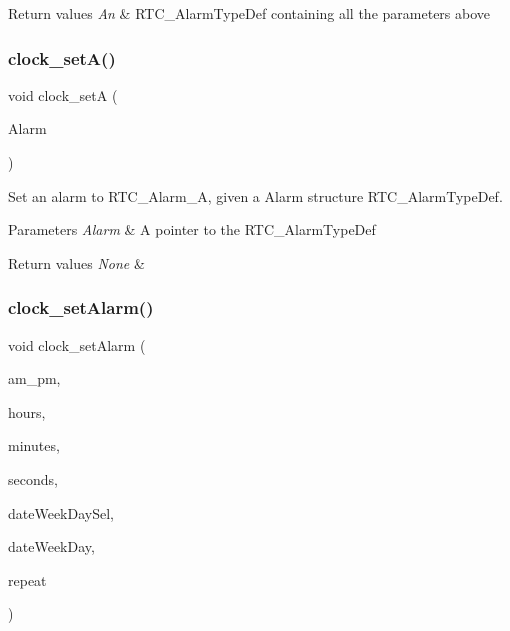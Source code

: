 \begin{DoxyRetVals}{Return values}
{\em An} & R\+T\+C\+\_\+\+Alarm\+Type\+Def containing all the parameters above \\
\hline
\end{DoxyRetVals}
\mbox{\label{group___clock___alarms_gab56f512746d4f2638232db28bb7dac2b}} 
\subsubsection{\texorpdfstring{clock\+\_\+set\+A()}{clock\_setA()}}
{\footnotesize\ttfamily void clock\+\_\+setA (\begin{DoxyParamCaption}\item[{R\+T\+C\+\_\+\+Alarm\+Type\+Def $\ast$}]{Alarm }\end{DoxyParamCaption})}



Set an alarm to R\+T\+C\+\_\+\+Alarm\+\_\+A, given a Alarm structure R\+T\+C\+\_\+\+Alarm\+Type\+Def. 


\begin{DoxyParams}{Parameters}
{\em Alarm} & A pointer to the R\+T\+C\+\_\+\+Alarm\+Type\+Def \\
\hline
\end{DoxyParams}

\begin{DoxyRetVals}{Return values}
{\em None} & \\
\hline
\end{DoxyRetVals}
\mbox{\label{group___clock___alarms_gaea1a099c4ad6de8b99517ac6453e3569}} 
\subsubsection{\texorpdfstring{clock\+\_\+set\+Alarm()}{clock\_setAlarm()}}
{\footnotesize\ttfamily void clock\+\_\+set\+Alarm (\begin{DoxyParamCaption}\item[{uint8\+\_\+t}]{am\+\_\+pm,  }\item[{uint8\+\_\+t}]{hours,  }\item[{uint8\+\_\+t}]{minutes,  }\item[{uint8\+\_\+t}]{seconds,  }\item[{uint32\+\_\+t}]{date\+Week\+Day\+Sel,  }\item[{uint8\+\_\+t}]{date\+Week\+Day,  }\item[{uint32\+\_\+t}]{repeat }\end{DoxyParamCaption})}



